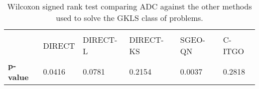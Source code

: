 \begin{table*}[h]
    \tiny
    \begin{center}
    
    \begin{tabular}{ P{1.0cm} P{1.0cm} P{1.2cm} P{1.0cm} P{1.0cm} P{1.0cm} }
                     &         &          &          &          &        \\[2em]
                     &  DIRECT & DIRECT-L &    DIRECT-KS   &    SGEO-QN   & C-ITGO \\[1em]
    \rule{0pt}{3ex}
    \textbf{p-value} & 0.0416 & 0.0781 & 0.2154 & 0.0037 & 0.2818 \\


    \end{tabular}
    \end{center}
    \vspace*{-4mm}
    \captionsetup{justification=centering}
    \caption{Wilcoxon signed rank test comparing ADC against the other methods used to solve the GKLS class of problems. \\[2em]}
    \label{tab:Wilcoxon2}
\end{table*}
